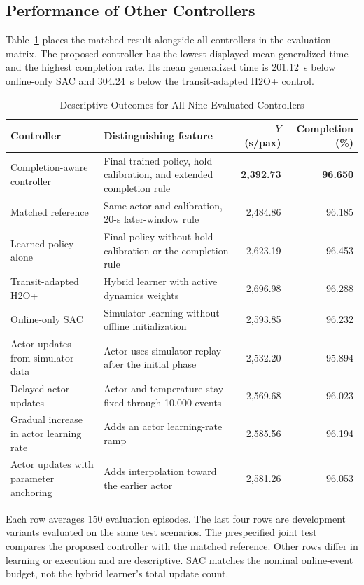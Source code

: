 \documentclass[letterpaper,journal]{IEEEtran}
\begin{document}
\subsection{Performance of Other Controllers}
Table~\ref{tab:controls} places the matched result alongside all controllers in the evaluation matrix. The proposed controller has the lowest displayed mean generalized time and the highest completion rate. Its mean generalized time is 201.12~s below online-only SAC and 304.24~s below the transit-adapted H2O+ control.

\begin{table}[!t]
\caption{Descriptive Outcomes for All Nine Evaluated Controllers}
\label{tab:controls}
\centering
\footnotesize
\begin{tabular}{@{}p{}p{}rr@{}}
\toprule
Controller & Distinguishing feature & \(Y\) (s/pax) & Completion (\%)\\
\midrule
Completion-aware controller & Final trained policy, hold calibration, and extended completion rule & \textbf{2,392.73} & \textbf{96.650}\\
Matched reference & Same actor and calibration, 20-s later-window rule & 2,484.86 & 96.185\\
Learned policy alone & Final policy without hold calibration or the completion rule & 2,623.19 & 96.453\\
Transit-adapted H2O+ & Hybrid learner with active dynamics weights & 2,696.98 & 96.288\\
Online-only SAC & Simulator learning without offline initialization & 2,593.85 & 96.232\\
Actor updates from simulator data & Actor uses simulator replay after the initial phase & 2,532.20 & 95.894\\
Delayed actor updates & Actor and temperature stay fixed through 10,000 events & 2,569.68 & 96.023\\
Gradual increase in actor learning rate & Adds an actor learning-rate ramp & 2,585.56 & 96.194\\
Actor updates with parameter anchoring & Adds interpolation toward the earlier actor & 2,581.26 & 96.053\\
\bottomrule
\end{tabular}
\par\smallskip
\begin{minipage}{\textwidth}
\footnotesize
Each row averages 150 evaluation episodes. The last four rows are development variants evaluated on the same test scenarios. The prespecified joint test compares the proposed controller with the matched reference. Other rows differ in learning or execution and are descriptive. SAC matches the nominal online-event budget, not the hybrid learner's total update count.
\end{minipage}
\end{table}
\end{document}
